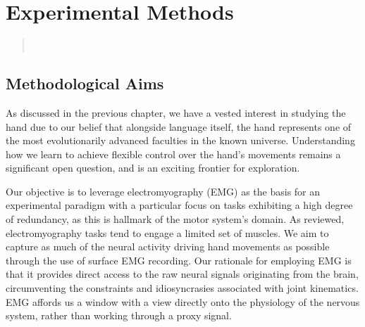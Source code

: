 \documentclass[../main.tex]{subfiles}
\begin{document}
\chapter{Experimental Methods}\label{chap:methods}

\bigskip
\begin{quote}
  \\
\end{quote}

\cleardoublepage%


\section{Methodological Aims}\label{sec:methods_aims}

As discussed in the previous chapter, we have a vested interest in studying the hand due to our belief that alongside language itself, the hand represents one of the most evolutionarily advanced faculties in the known universe. Understanding how we learn to achieve flexible control over the hand's movements remains a significant open question, and is an exciting frontier for exploration.

Our objective is to leverage electromyography (EMG) as the basis for an experimental paradigm with a particular focus on tasks exhibiting a high degree of redundancy, as this is hallmark of the motor system's domain. As reviewed, electromyography tasks tend to engage a limited set of muscles. We aim to capture as much of the neural activity driving hand movements as possible through the use of surface EMG recording. Our rationale for employing EMG is that it provides direct access to the raw neural signals originating from the brain, circumventing the constraints and idiosyncrasies associated with joint kinematics. EMG affords us a window with a view directly onto the physiology of the nervous system, rather than working through a proxy signal.
\end{document}
